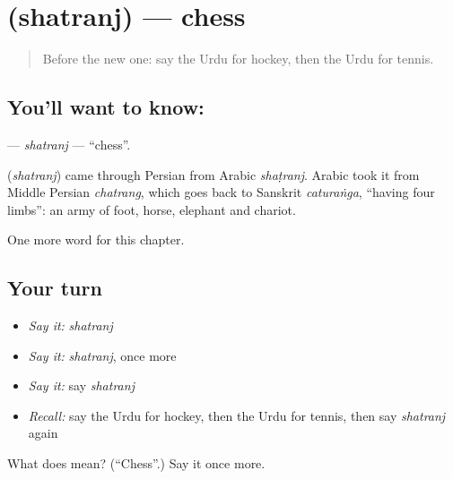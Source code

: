 \section[\texorpdfstring{\ur{شطرنج} (shatranj)}{شطرنج (shatranj)}]{ (shatranj) — chess}

\label{lesson:UR-C201-shatranj}



\begin{quote}
Before the new one: say the Urdu for hockey, then the Urdu for tennis.
\end{quote}

\subsection*{You'll want to know: }
\textbf{} — \emph{shatranj} — \textquotedblleft{}chess\textquotedblright{}.

\begin{cousinweb}
\textbf{} (\emph{shatranj}) came through Persian from Arabic \emph{shaṭranj}. Arabic took it from Middle Persian \emph{chatrang}, which goes back to Sanskrit \emph{caturaṅga}, \textquotedblleft{}having four limbs\textquotedblright{}: an army of foot, horse, elephant and chariot.
\end{cousinweb}

\begin{grammarlens}[title={What you've built}]
One more word for this chapter.
\end{grammarlens}

\subsection*{Your turn}
\begin{itemize}
\raggedright
  \item \emph{Say it:} \emph{shatranj}
  \item \emph{Say it:} \emph{shatranj}, once more
  \item \emph{Say it:} say \emph{shatranj}
  \item \emph{Recall:} say the Urdu for hockey, then the Urdu for tennis, then say \emph{shatranj} again
\end{itemize}

\begin{tcolorbox}[breakable,colback=teal!4,colframe=teal!35!black,title={Before you move on}]
What does  mean? (\textquotedblleft{}Chess\textquotedblright{}.) Say it once more.
\end{tcolorbox}
